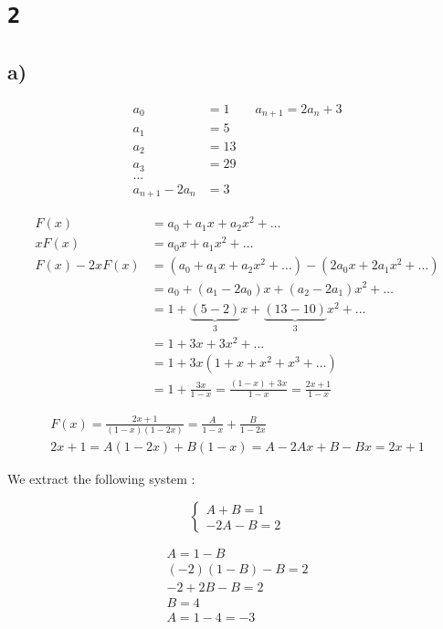 \documentclass[a4paper,11pt]{report}
\begin{document}
\section*{\texttt{2}}

\subsection*{a)}

\begin{align*}
  a_0 &= 1 \qquad a_{n+1} = 2 a_n + 3 \\
  a_1 &= 5 \\
  a_2 &= 13 \\
  a_3 &= 29 \\
  \dots \\
  a_{n+1} - 2a_n &= 3
\end{align*}

\begin{align*}
  F(x) &= a_0 + a_1 x + a_2 x^2 + \dots \\
  x F(x) &=     a_0 x + a_1x^2 + \dots \\
  F(x) - 2 x F(x) &= (a_0 + a_1 x + a_2 x^2 + \dots ) - (2 a_0 x + 2 a_1 x^2 + \dots) \\
       &= a_0 + (a_1 - 2 a_0) x + (a_2 - 2 a_1) x^2 + \dots \\
       &= 1 + \underbrace{(5-2)}_3 x + \underbrace{(13-10)}_3 x^2 + \dots \\
       &= 1 + 3x + 3x^2 + \dots \\
       &= 1 + 3x(1 + x + x^2 + x^3 + \dots) \\
       &= 1 + \frac{3x}{1-x} = \frac{(1-x) + 3x}{1-x} = \frac{2x+1}{1-x}
\end{align*}

\begin{align*}
  F(x) = \frac{2x+1}{(1-x)(1-2x)} = \frac{A}{1-x} + \frac{B}{1-2x} \\
  2x + 1 = A(1-2x) + B(1-x) = A - 2Ax + B - Bx = 2x + 1
\end{align*}

We extract the following system :

\[
  \begin{cases}
    A + B = 1 \\
    -2 A - B = 2
  \end{cases}
\]

\begin{gather*}
  A = 1 - B \\
  (-2)(1-B) - B  = 2 \\
  -2 + 2B -B = 2 \\
  B = 4 \\
  A = 1 - 4 = -3
\end{gather*}
\end{document}

